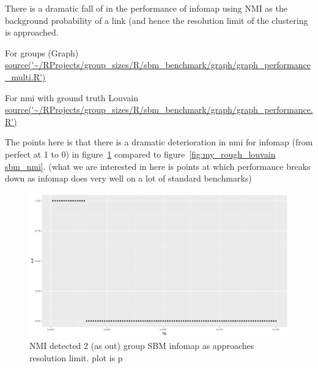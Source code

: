 There is a dramatic fall of in the performance of infomap using NMI as the background probability of a link (and hence the resolution limit of the clustering is approached.

For groups (Graph)  \url{source('~/RProjects/group_sizes/R/sbm_benchmark/graph/graph_performance_multi.R')}

For nmi with ground truth Louvain
\url{source('~/RProjects/group_sizes/R/sbm_benchmark/graph/graph_performance.R')}

The points here is that there is a dramatic deterioration in nmi for infomap (from perfect at 1 to 0) in figure~\ref{fig:my_rough_infomap} compared to figure~\ref{fig:my_rough_louvain sbm_nmi}. (what we are interested in here is points at which performance breaks down as infomap does very well on a lot of standard benchmarks)


\begin{figure}
    \centering
    \includegraphics[width=\textwidth]{images/Rplot_rough_infomap_nmi_sbm.png}
    \caption{NMI detected 2 (as out) group SBM infomap as approaches resolution limit. plot is p}
    \label{fig:my_rough_infomap}
\end{figure}

